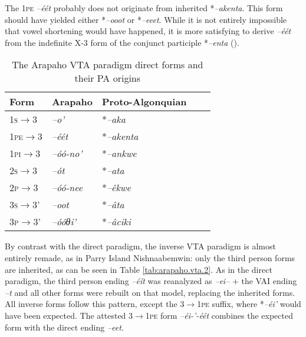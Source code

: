 \documentclass[twoside,a4paper,11pt]{article}
\newcommand{\ipa}[1]{{\phon\textit{#1}}}
\newcommand{\grise}[1]{\cellcolor{lightgray}\textbf{#1}}
\newcommand{\Σ}{\greek{Σ}}
\begin{document}
The \textsc{1pe} \ipa{--éét} probably does not originate from inherited  *\ipa{--akenta}. This form should have yielded  either *\ipa{--ooot} or *\ipa{--eeet}. While it is not entirely impossible that vowel shortening would have happened, it is more satisfying to derive  \ipa{--éét}  from the indefinite X-3 form of the conjunct participle  *\ipa{--enta} (\citealt{goddard98morphology.arapaho}).

\begin{table}[H]
\caption{The Arapaho VTA paradigm direct forms and their PA origins}
\centering \label{tab:arapaho.vta.1}
\begin{tabular}{lllll}
\toprule
Form& Arapaho & Proto-Algonquian \\
\midrule
 \textsc{1s}$\rightarrow$3 & 	\ipa{--o'} & 	*\ipa{--aka} & 		\\		
\textsc{1pe}$\rightarrow$3 & 	\ipa{--éét}\grise{} & 	 *\ipa{--akenta} & 		\\		
\textsc{1pi}$\rightarrow$3 & 	\ipa{--óó-no'}\grise{} & *\ipa{--ankwe} & 		\\		
\midrule
\textsc{2s}$\rightarrow$3 & 	\ipa{--ót} & 	*\ipa{--ata} & 		\\		
\textsc{2p}$\rightarrow$3 & 	\ipa{--óó-nee} \grise{}& *\ipa{--êkwe} & 		\\		
\midrule
\textsc{3s}$\rightarrow$3' & 	\ipa{--oot} & 	*\ipa{--âta} & 		\\		
\textsc{3p}$\rightarrow$3' & 	\ipa{--óóθi'} & 	*\ipa{--âciki} & 		\\		
\bottomrule
\end{tabular}
\end{table}

By contrast with the direct paradigm, the inverse   VTA paradigm is almost entirely remade, as in Parry Island Nishnaabemwin: only the third person forms are inherited, as can be seen in Table \ref{tab:arapaho.vta.2}. As in the direct paradigm, the third person ending \ipa{--éít} was reanalyzed as \ipa{--ei--} + the VAI ending \ipa{--t} and all other forms were rebuilt on that model, replacing the inherited forms. All inverse forms follow this pattern, except the \textsc{3$\rightarrow$1pe} suffix, where *\ipa{--éi'} would have been expected. The attested \textsc{3$\rightarrow$1pe} form \ipa{--éi-'-éét} combines the expected form with the direct ending \ipa{--eet}.
\end{document}
